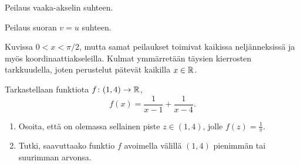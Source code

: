 \documentclass[11pt,a4paper]{amsart}
\begin{document}
\begin{solution}
\begin{center}
\begin{minipage}[t]{0.48\linewidth}
      \small Peilaus vaaka-akselin suhteen.
    \end{minipage}\hfill
    \begin{minipage}[t]{0.48\linewidth}
      \centering

      \small Peilaus suoran \(v=u\) suhteen.
    \end{minipage}
  \end{center}

  Kuvissa \(0 < x < \pi/2\), mutta samat peilaukset toimivat kaikissa
  neljänneksissä ja myös koordinaattiakseleilla. Kulmat ymmärretään
  täysien kierrosten tarkkuudella, joten perustelut pätevät kaikilla
  \(x \in \mathbb{R}\).
\end{solution}

\begin{exercise}
  Tarkastellaan funktiota \(f \colon (1, 4) \to \mathbb{R}\),
  \[
    f(x) = \frac{1}{x - 1} + \frac{1}{x - 4}.
  \]
  \begin{enumerate}[label=(\alph*)]
    \item Osoita, että on olemassa sellainen piste \(z \in (1, 4)\), jolle
      \(f(z) = \frac{1}{\pi}\).
    \item Tutki, saavuttaako funktio \(f\) avoimella välillä \((1, 4)\)
      pienimmän tai suurimman arvonsa.
  \end{enumerate}
\end{exercise}
\end{document}
